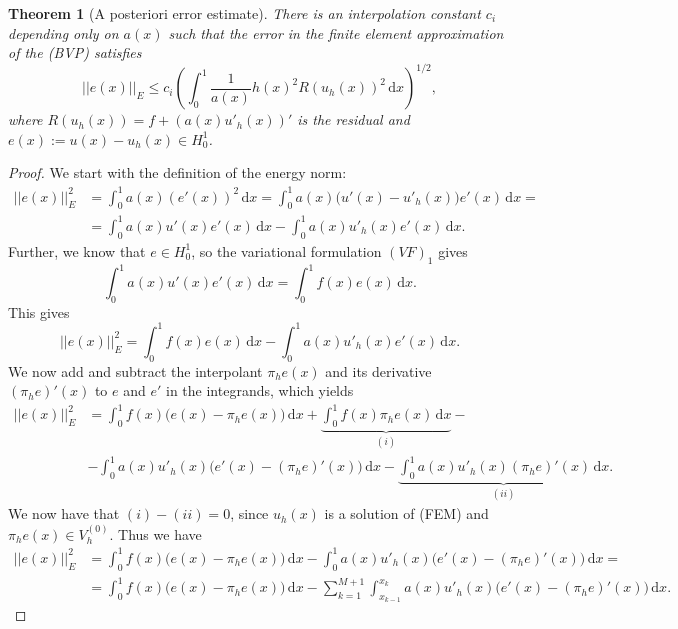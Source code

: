 \documentclass[12pt, a4paper]{article}
\newcommand{\rd}{\ensuremath{\mathrm{d}}}
\newcommand{\id}{\ensuremath{\,\rd}}
\newtheorem{theorem}{Theorem}[section]
\numberwithin{equation}{section}
\begin{document}
\begin{theorem}[A posteriori error estimate]
There is an interpolation constant $c_i$ depending only on $a(x)$ such that the error in the finite element approximation of the \textnormal{(BVP)} satisfies
\begin{equation*}
||e(x)||_E \leq c_i \left ( \int_0^1 \frac{1}{a(x)}h(x)^2R(u_h(x))^2\id x\right)^{1/2},
\end{equation*}
where $R(u_h(x)) = f + (a(x)u'_h(x))'$ is the residual and $e(x) := u(x)-u_h(x)\in H_0^1$.
\end{theorem}
\begin{proof}
We start with the definition of the energy norm:
\begin{equation*}
\begin{split}
||e(x)||^2_E &= \int_0^1 a(x)(e'(x))^2 \id x = \int_0^1 a(x)\big(u'(x)-u'_h(x)\big)e'(x) \id x = \\
& = \int_0^1 a(x)u'(x)e'(x) \id x - \int_0^1 a(x)u'_h(x)e'(x)\id x.
\end{split}
\end{equation*}
Further, we know that $e\in H_0^1$, so the variational formulation $(VF)_1$ gives
\begin{equation*}
\int_0^1 a(x)u'(x)e'(x) \id x = \int_0^1 f(x)e(x) \id x.
\end{equation*}
This gives
\begin{equation*}
||e(x)||^2_E = \int_0^1 f(x)e(x)\id x - \int_0^1 a(x)u'_h(x)e'(x)\id x.
\end{equation*}
We now add and subtract the interpolant $\pi_he(x)$ and its derivative $(\pi_he)'(x)$ to $e$ and $e'$ in the integrands, which yields
\begin{equation*}
\begin{split}
||e(x)||^2_E &= \int_0^1f(x)\big(e(x)-\pi_he(x)\big)\id x + \underbrace{\int_0^1 f(x)\pi_he(x)\id x}_{(i)} - \\
& -\int_0^1 a(x)u'_h(x)\big(e'(x) - (\pi_he)'(x)\big)\id x - \underbrace{\int_0^1 a(x)u'_h(x)(\pi_he)'(x) \id x}_{(ii)}.
\end{split}
\end{equation*}
We now have that $(i)-(ii) = 0$, since $u_h(x)$ is a solution of (FEM) and $\pi_he(x)\in V_h^{(0)}$. Thus we have
\begin{equation*}
\begin{split}
||e(x)||^2_E &= \int_0^1 f(x)\big( e(x)-\pi_he(x)\big)\id x - \int_0^1 a(x)u'_h(x)\big(e'(x)-(\pi_he)'(x)\big)\id x = \\
&= \int_0^1 f(x)\big (e(x)-\pi_h e(x)\big)  \id x - \sum_{k=1}^{M+1} \int_{x_{k-1}}^{x_k} a(x) u'_h(x)\big( e'(x)-(\pi_he)'(x)\big)\id x.

\end{split}
\end{equation*}
\end{proof}
\end{document}
